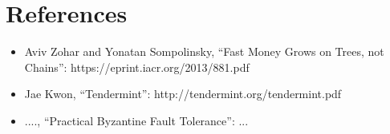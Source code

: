 \documentclass[12pt]{article}
\begin{document}
\section{References}


\begin{itemize}
\item Aviv Zohar and Yonatan Sompolinsky, ``Fast Money Grows on Trees, not Chains'': https://eprint.iacr.org/2013/881.pdf
\item Jae Kwon, ``Tendermint'': http://tendermint.org/tendermint.pdf
\item ...., ``Practical Byzantine Fault Tolerance'': ...
\end{itemize}
\end{document}
